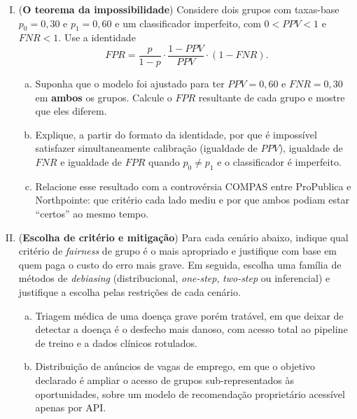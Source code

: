 \documentclass{dlproblemset}
\begin{document}
\begin{enumerate}[I)]
    \item (\textbf{O teorema da impossibilidade}) Considere dois grupos com taxas-base $p_0 = 0{,}30$ e $p_1 = 0{,}60$ e um classificador imperfeito, com $0 < PPV < 1$ e $FNR < 1$. Use a identidade
    \[
        FPR = \frac{p}{1-p} \cdot \frac{1-PPV}{PPV} \cdot (1 - FNR).
    \]
    \begin{enumerate}[(a)]
        \item Suponha que o modelo foi ajustado para ter $PPV = 0{,}60$ e $FNR = 0{,}30$ em \textbf{ambos} os grupos. Calcule o $FPR$ resultante de cada grupo e mostre que eles diferem.
        \item Explique, a partir do formato da identidade, por que é impossível satisfazer simultaneamente calibração (igualdade de $PPV$), igualdade de $FNR$ e igualdade de $FPR$ quando $p_0 \neq p_1$ e o classificador é imperfeito.
        \item Relacione esse resultado com a controvérsia COMPAS entre ProPublica e Northpointe: que critério cada lado mediu e por que ambos podiam estar ``certos'' ao mesmo tempo.
    \end{enumerate}

    \item (\textbf{Escolha de critério e mitigação}) Para cada cenário abaixo, indique qual critério de \textit{fairness} de grupo é o mais apropriado e justifique com base em quem paga o custo do erro mais grave. Em seguida, escolha uma família de métodos de \textit{debiasing} (distribucional, \textit{one-step}, \textit{two-step} ou inferencial) e justifique a escolha pelas restrições de cada cenário.
    \begin{enumerate}[(a)]
        \item Triagem médica de uma doença grave porém tratável, em que deixar de detectar a doença é o desfecho mais danoso, com acesso total ao pipeline de treino e a dados clínicos rotulados.
        \item Distribuição de anúncios de vagas de emprego, em que o objetivo declarado é ampliar o acesso de grupos sub-representados às oportunidades, sobre um modelo de recomendação proprietário acessível apenas por API.
    \end{enumerate}


\end{enumerate}
\end{document}
